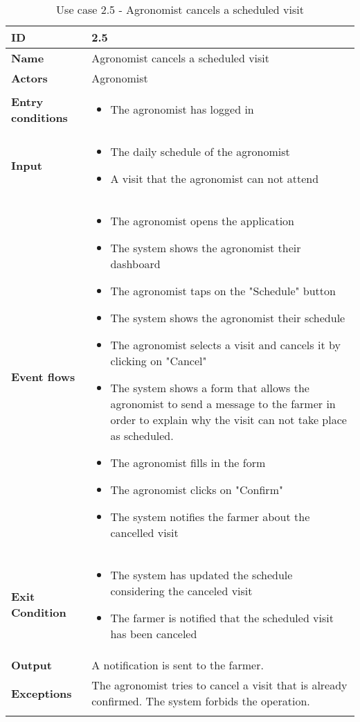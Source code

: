 \begin{longtable}[H]{ | l | p{10cm} | }
\hline
{\cellcolor[rgb]{0.753,0.753,0.753}}\textbf{ID}  & 2.5 \\ \hline
{\cellcolor[rgb]{0.753,0.753,0.753}}\textbf{Name} & Agronomist cancels a scheduled visit\\ \hline
{\cellcolor[rgb]{0.753,0.753,0.753}}\textbf{Actors} & Agronomist \\ \hline
{\cellcolor[rgb]{0.753,0.753,0.753}}\textbf{Entry conditions} &
\begin{itemize}
    \item The agronomist has logged in
\end{itemize}
\\ \hline
{\cellcolor[rgb]{0.753,0.753,0.753}}\textbf{Input} &
\begin{itemize}
    \item The daily schedule of the agronomist
    \item A visit that the agronomist can not attend
\end{itemize}
\\ \hline
{\cellcolor[rgb]{0.753,0.753,0.753}}\textbf{Event flows} &
\begin{itemize}
    \item The agronomist opens the application
    \item The system shows the agronomist their dashboard
    \item The agronomist taps on the "Schedule" button
    \item The system shows the agronomist their schedule
    \item The agronomist selects a visit and cancels it by clicking on "Cancel"
    \item The system shows a form that allows the agronomist to send a message to the farmer in order to explain why the visit can not take place as scheduled.
    \item The agronomist fills in the form
    \item The agronomist clicks on "Confirm"
    \item The system notifies the farmer about the cancelled visit
\end{itemize}
\\ \hline
{\cellcolor[rgb]{0.753,0.753,0.753}}\textbf{Exit Condition} &
\begin{itemize}
    \item The system has updated the schedule considering the canceled visit
    \item The farmer is notified that the scheduled visit has been canceled
\end{itemize}
\\ \hline
{\cellcolor[rgb]{0.753,0.753,0.753}}\textbf{Output} & A notification is sent to the farmer.
\\ \hline
{\cellcolor[rgb]{0.753,0.753,0.753}}\textbf{Exceptions} &
The agronomist tries to cancel a visit that is already confirmed. The system forbids the operation.
\\ \hline
\caption{Use case 2.5 - Agronomist cancels a scheduled visit}
\\
\end{longtable}